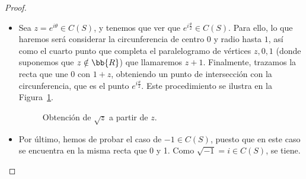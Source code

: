 \begin{lema}
\begin{proof}
\begin{itemize}
            \item Sea $z=e^{i\theta}\in C(S)$, y tenemos que ver que $e^{i\frac{\theta}{2}}\in C(S)$. Para ello, lo que haremos será considerar la circunferencia de centro $0$ y radio hasta $1$, así como el cuarto punto que completa el paralelogramo de vértices $z,0,1$ (donde suponemos que $z\notin \bb{R}$) que llamaremos $z+1$. Finalmente, trazamos la recta que une $0$ con $1+z$, obteniendo un punto de intersección con la circunferencia, que es el punto $e^{i\frac{\theta}{2}}$. Este procedimiento se ilustra en la Figura~\ref{fig:raiz_cuadrada_compleja}.
            \begin{figure}[h]
                \centering
                \caption{Obtención de $\sqrt{z}$ a partir de $z$.}
                \label{fig:raiz_cuadrada_compleja}
            \end{figure}

            \item Por último, hemos de probar el caso de $-1\in C(S)$, puesto que en este caso se encuentra en la misma recta que 0 y 1. Como $\sqrt{-1}=i\in C(S)$, se tiene.\qedhere
        \end{itemize}
    \end{proof}
\end{lema}

